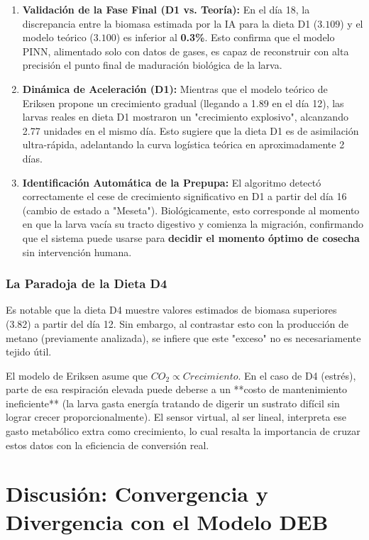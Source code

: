 \begin{enumerate}
    \item \textbf{Validación de la Fase Final (D1 vs. Teoría):} 
    En el día 18, la discrepancia entre la biomasa estimada por la IA para la dieta D1 ($3.109$) y el modelo teórico ($3.100$) es inferior al \textbf{0.3\%}. Esto confirma que el modelo PINN, alimentado solo con datos de gases, es capaz de reconstruir con alta precisión el punto final de maduración biológica de la larva.

    \item \textbf{Dinámica de Aceleración (D1):}
    Mientras que el modelo teórico de Eriksen propone un crecimiento gradual (llegando a 1.89 en el día 12), las larvas reales en dieta D1 mostraron un "crecimiento explosivo", alcanzando 2.77 unidades en el mismo día. Esto sugiere que la dieta D1 es de asimilación ultra-rápida, adelantando la curva logística teórica en aproximadamente 2 días.

    \item \textbf{Identificación Automática de la Prepupa:}
    El algoritmo detectó correctamente el cese de crecimiento significativo en D1 a partir del día 16 (cambio de estado a "Meseta"). Biológicamente, esto corresponde al momento en que la larva vacía su tracto digestivo y comienza la migración, confirmando que el sistema puede usarse para \textbf{decidir el momento óptimo de cosecha} sin intervención humana.
\end{enumerate}

\subsection{La Paradoja de la Dieta D4}
Es notable que la dieta D4 muestre valores estimados de biomasa superiores (3.82) a partir del día 12. Sin embargo, al contrastar esto con la producción de metano (previamente analizada), se infiere que este "exceso" no es necesariamente tejido útil. 

El modelo de Eriksen asume que $CO_2 \propto Crecimiento$. En el caso de D4 (estrés), parte de esa respiración elevada puede deberse a un **costo de mantenimiento ineficiente** (la larva gasta energía tratando de digerir un sustrato difícil sin lograr crecer proporcionalmente). El sensor virtual, al ser lineal, interpreta ese gasto metabólico extra como crecimiento, lo cual resalta la importancia de cruzar estos datos con la eficiencia de conversión real.

\chapter{Discusión: Convergencia y Divergencia con el Modelo DEB}

